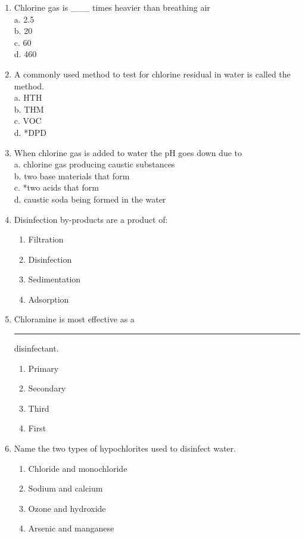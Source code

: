 \begin{enumerate}






  \item Chlorine gas is \_\_\_ times heavier than breathing air\\
a. 2.5\\
b. 20\\
c. 60\\
d. 460\\
  \item A commonly used method to test for chlorine residual in water is called the method.\\
a. HTH\\
b. THM\\
c. VOC\\
d. *DPD\\

  \item When chlorine gas is added to water the $\mathrm{pH}$ goes down due to\\
a. chlorine gas producing caustic substances\\
b. two base materials that form\\
c. *two acids that form\\
d. caustic soda being formed in the water 

\item Disinfection by-products are a product of:
\begin{enumerate}
\item Filtration
\item Disinfection
\item Sedimentation
\item Adsorption
\end{enumerate}

\item Chloramine is most effective as a \rule{2cm}{0.3pt} disinfectant.
\begin{enumerate}
\item Primary
\item Secondary
\item Third
\item First
\end{enumerate}

\item Name the two types of hypochlorites used to disinfect water.
\begin{enumerate}
\item Chloride and monochloride
\item Sodium and calcium
\item Ozone and hydroxide
\item Arsenic and manganese
\end{enumerate}


\end{enumerate}
